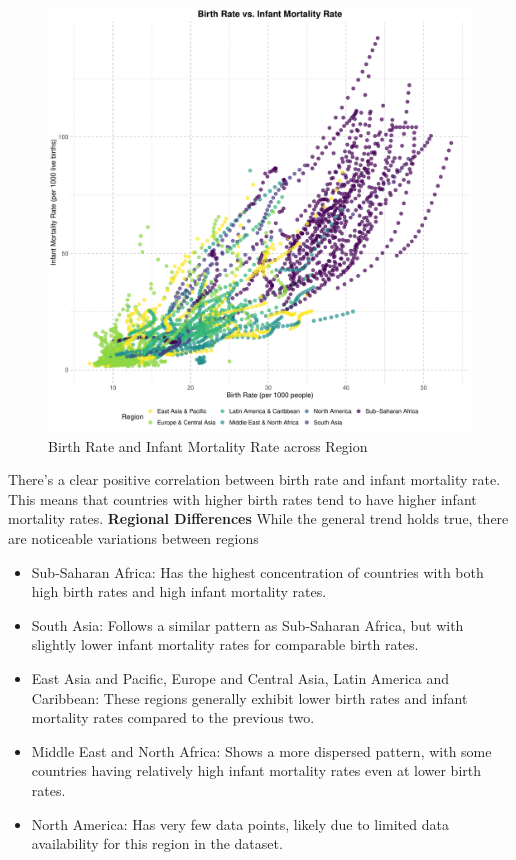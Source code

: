 \documentclass{article}\usepackage[]{graphicx}\usepackage[]{xcolor}
\makeatletter
\def\maxwidth{ %
  \ifdim\Gin@nat@width>\linewidth
    \linewidth
  \else
    \Gin@nat@width
  \fi
}
\newenvironment{knitrout}{}{} %
\makeatother
\begin{document}
\begin{figure}[h!]
\centering
\begin{knitrout}
\color{fgcolor}
\includegraphics[width=\maxwidth]{figure/unnamed-chunk-13-1} 
\end{knitrout}
\caption{Birth Rate and Infant Mortality Rate across Region}
\label{fig}
\end{figure}
There's a clear positive correlation between birth rate and infant mortality rate. This means that countries with higher birth rates tend to have higher infant mortality rates.
\textbf{Regional Differences}
While the general trend holds true, there are noticeable variations between regions
\begin{itemize}
\item{Sub-Saharan Africa: Has the highest concentration of countries with both high birth rates and high infant mortality rates.}
\item{South Asia: Follows a similar pattern as Sub-Saharan Africa, but with slightly lower infant mortality rates for comparable birth rates.}
\item{East Asia and Pacific, Europe and Central Asia, Latin America and Caribbean: These regions generally exhibit lower birth rates and infant mortality rates compared to the previous two.}
\item{Middle East and North Africa: Shows a more dispersed pattern, with some countries having relatively high infant mortality rates even at lower birth rates.}
\item{North America: Has very few data points, likely due to limited data availability for this region in the dataset.}
\end{itemize}
\end{document}
